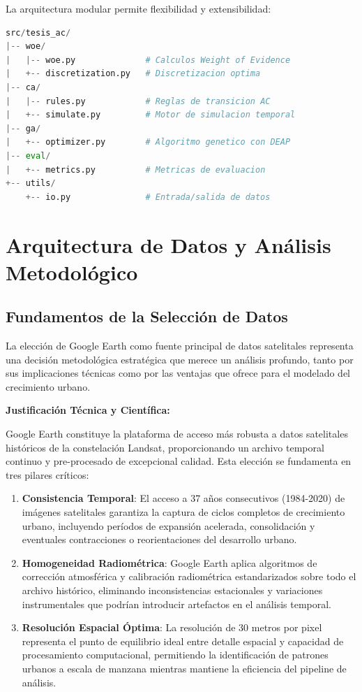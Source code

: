 \documentclass[12pt,letterpaper]{article}
\begin{document}
La arquitectura modular permite flexibilidad y extensibilidad:

\begin{lstlisting}[language=Python, caption=Estructura del Sistema WoE-AC-AG]
src/tesis_ac/
|-- woe/
|   |-- woe.py              # Calculos Weight of Evidence
|   +-- discretization.py   # Discretizacion optima
|-- ca/
|   |-- rules.py            # Reglas de transicion AC
|   +-- simulate.py         # Motor de simulacion temporal
|-- ga/
|   +-- optimizer.py        # Algoritmo genetico con DEAP
|-- eval/
|   +-- metrics.py          # Metricas de evaluacion
+-- utils/
    +-- io.py               # Entrada/salida de datos
\end{lstlisting}

\section{Arquitectura de Datos y Análisis Metodológico}

\subsection{Fundamentos de la Selección de Datos}

La elección de Google Earth como fuente principal de datos satelitales representa una decisión metodológica estratégica que merece un análisis profundo, tanto por sus implicaciones técnicas como por las ventajas que ofrece para el modelado del crecimiento urbano.

\textbf{Justificación Técnica y Científica:}

Google Earth constituye la plataforma de acceso más robusta a datos satelitales históricos de la constelación Landsat, proporcionando un archivo temporal continuo y pre-procesado de excepcional calidad. Esta elección se fundamenta en tres pilares críticos:

\begin{enumerate}
\item \textbf{Consistencia Temporal}: El acceso a 37 años consecutivos (1984-2020) de imágenes satelitales garantiza la captura de ciclos completos de crecimiento urbano, incluyendo períodos de expansión acelerada, consolidación y eventuales contracciones o reorientaciones del desarrollo urbano.

\item \textbf{Homogeneidad Radiométrica}: Google Earth aplica algoritmos de corrección atmosférica y calibración radiométrica estandarizados sobre todo el archivo histórico, eliminando inconsistencias estacionales y variaciones instrumentales que podrían introducir artefactos en el análisis temporal.

\item \textbf{Resolución Espacial Óptima}: La resolución de 30 metros por pixel representa el punto de equilibrio ideal entre detalle espacial y capacidad de procesamiento computacional, permitiendo la identificación de patrones urbanos a escala de manzana mientras mantiene la eficiencia del pipeline de análisis.
\end{enumerate}
\end{document}

